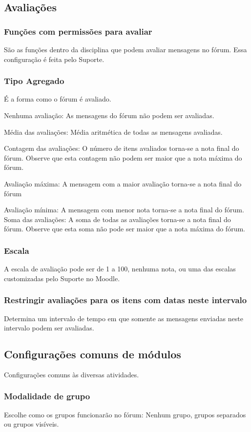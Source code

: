\subsection{Avaliações}
\subsubsection{Funções com permissões para avaliar}
São as funções dentro da disciplina que podem avaliar mensagens no fórum. Essa configuração é feita pelo Suporte.
\subsubsection{Tipo Agregado}
É a forma como o fórum é avaliado.

Nenhuma avaliação: As mensagens do fórum não podem ser avaliadas.

Média das avaliações: Média aritmética de todas as mensagens avaliadas.

Contagem das avaliações: O número de itens avaliados torna-se a nota final do fórum. Observe que esta contagem não podem ser maior que a nota máxima do fórum.

Avaliação máxima: A mensagem com a maior avaliação torna-se a nota final do fórum

Avaliação mínima: A mensagem com menor nota torna-se a nota final do fórum.
Soma das avaliações: A soma de todas as avaliações torna-se a nota final do fórum. Observe que esta soma não pode ser maior que a nota máxima do fórum.
\subsubsection{Escala}
A escala de avaliação pode ser de 1 a 100, nenhuma nota, ou uma das escalas customizadas pelo Suporte no Moodle.
\subsubsection{Restringir avaliações para os itens com datas neste intervalo}
Determina um intervalo de tempo em que somente as mensagens enviadas neste intervalo podem ser avaliadas.
\subsection{Configurações comuns de módulos}
Configurações comuns às diversas atividades.
\subsubsection{Modalidade de grupo}
Escolhe como os grupos funcionarão no fórum: Nenhum grupo, grupos separados ou grupos visíveis.

